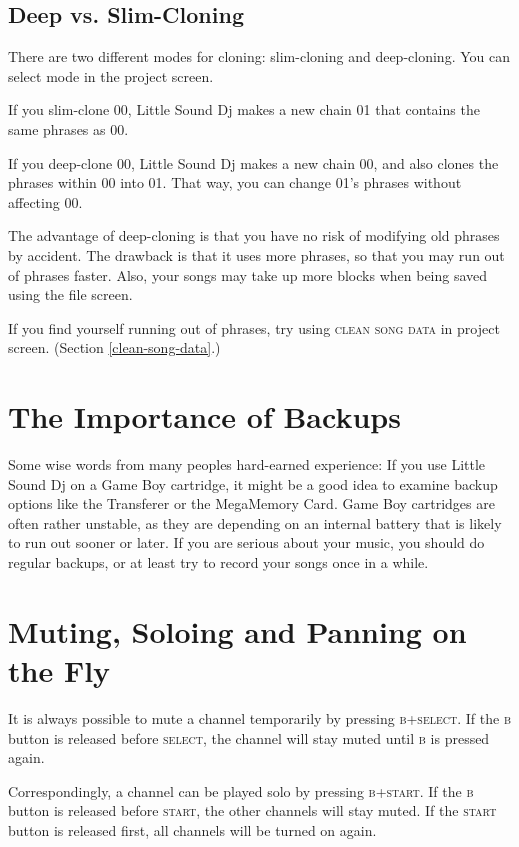 \subsection{Deep vs. Slim-Cloning}

There are two different modes for cloning: slim-cloning and deep-cloning. You can select mode in the project screen.

If you slim-clone 00, Little Sound Dj makes a new chain 01 that
contains the same phrases as 00.

If you deep-clone 00, Little Sound Dj makes a new chain 00, and
also clones the phrases within 00 into 01. That way,
you can change 01's phrases without affecting 00.

The advantage of deep-cloning is that you have no risk of modifying old phrases by accident. The drawback is that it uses more phrases, so that you may run out of phrases faster. Also, your songs may take up more blocks when being saved using the file screen.

If you find yourself running out of phrases, try using \textsc{clean song data} in project screen. (Section \ref{clean-song-data}.)

\section{The Importance of Backups}

Some wise words from many peoples hard-earned experience: If you use Little Sound Dj on a Game Boy cartridge, it might be a good idea to examine backup options like the Transferer or the MegaMemory Card. Game Boy cartridges are often rather unstable, as they are depending on an internal battery that is likely to run out sooner or later. If you are serious about your music, you should do regular backups, or at least try to record your songs once in a while.

\section{Muting, Soloing and Panning on the Fly}

It is always possible to mute a channel temporarily by pressing \textsc{b+select}. If the \textsc{b} button is released before \textsc{select}, the channel will stay muted until \textsc{b} is pressed again. 

Correspondingly, a channel can be played solo by pressing \textsc{b+start}. If the \textsc{b} button is released before \textsc{start}, the other channels will stay muted. If the \textsc{start} button is released first, all channels will be turned on again.
 
